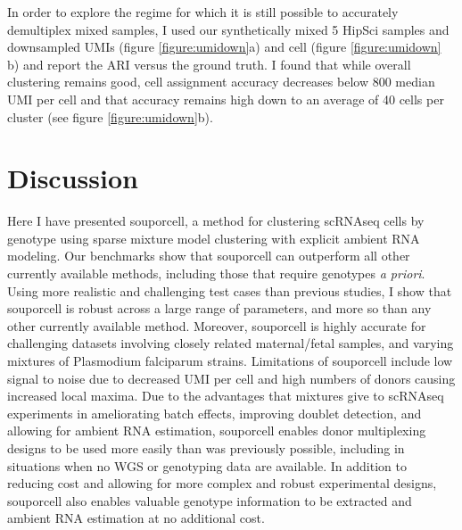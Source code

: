 \par{
In order to explore the regime for which it is still possible to accurately demultiplex mixed samples, I
used our synthetically mixed 5 HipSci samples and downsampled UMIs (figure \ref{figure:umidown}a) and cell (figure \ref{figure:umidown}
b) and report the ARI versus the ground truth. I found that while overall clustering remains good, cell
assignment accuracy decreases below 800 median UMI per cell and that accuracy remains high down to
an average of 40 cells per cluster (see figure \ref{figure:umidown}b). 
}






\section{Discussion}
\par{
Here I have presented souporcell, a method for clustering scRNAseq cells by genotype using sparse mixture model clustering with explicit ambient RNA modeling. Our benchmarks show that souporcell can outperform all other currently available methods, including those that require genotypes \textit{a priori}. Using more realistic and challenging test cases than previous studies, I show that souporcell is robust across a large range of parameters, and more so than any other currently available method. Moreover, souporcell is highly accurate for challenging datasets involving closely related maternal/fetal samples, and varying mixtures of Plasmodium falciparum strains. Limitations of souporcell include low signal to noise due to decreased UMI per cell and high numbers of donors causing increased local maxima. Due to the advantages that mixtures give to scRNAseq experiments in ameliorating batch effects, improving doublet detection, and allowing for ambient RNA estimation, souporcell enables donor multiplexing designs to be used more easily than was previously possible, including in situations when no WGS or genotyping data are available. In addition to reducing cost and allowing for more complex and robust experimental designs, souporcell also enables valuable genotype information to be extracted and ambient RNA estimation at no additional cost.
}


